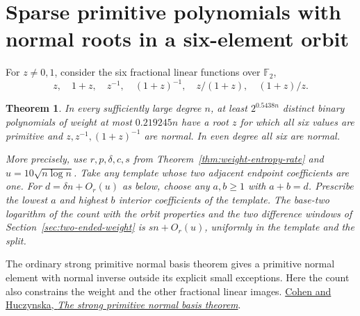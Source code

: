 \documentclass[11pt]{article}
\newtheorem{theorem}{Theorem}
\newcommand{\F}{\mathbb F_2}
\begin{document}
\section{Sparse primitive polynomials with normal roots in a six-element orbit}
\label{sec:normal-weight-orbit}
For \(z\ne0,1\), consider the six fractional linear functions over \(\F\),
\[
 z,\quad 1+z,\quad z^{-1},\quad (1+z)^{-1},\quad
 z/(1+z),\quad (1+z)/z .
\]
\begin{theorem}\label{thm:normal-weight-orbit}
In every sufficiently large degree \(n\), at least \(2^{0.5438n}\)
distinct binary polynomials of weight at most \(0.219245n\) have a
root \(z\) for which all six values are primitive and
\(z,z^{-1},(1+z)^{-1}\) are normal. In even degree all six are normal.

More precisely, use \(r,p,\delta,c,s\) from
Theorem~\ref{thm:weight-entropy-rate} and \(u=10\sqrt{n\log n}\).
Take any template whose two adjacent endpoint coefficients are one.
For \(d=\delta n+O_r(u)\) as below, choose any \(a,b\ge1\) with \(a+b=d\).
Prescribe the lowest \(a\) and highest \(b\) interior coefficients
of the template. The base-two logarithm of the count with the orbit
properties and the two difference windows of Section~\ref{sec:two-ended-weight}
is \(sn+O_r(u)\), uniformly in the template and the split.
\end{theorem}
The ordinary strong primitive normal basis theorem gives a primitive
normal element with normal inverse outside its explicit small exceptions.
Here the count also constrains the weight and the other fractional linear
images. \href{https://arxiv.org/abs/math/0610400}{Cohen and Huczynska,
\emph{The strong primitive normal basis theorem}}.
\end{document}
